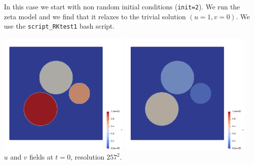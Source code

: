 In this case we start with non random initial conditions (\lstinline{init=2}).
We run the zeta model and we find that it relaxes to the trivial solution $(u=1,v=0)$.
We use the {\tt script\_RKtest1} bash script.

\begin{center}
\includegraphics[height=6cm]{python_codes/fieldstone_171/RKtest1/u0}
\includegraphics[height=6cm]{python_codes/fieldstone_171/RKtest1/v0}\\
{\captionfont $u$ and $v$ fields at $t=0$, resolution $257^2$.}
\end{center}

